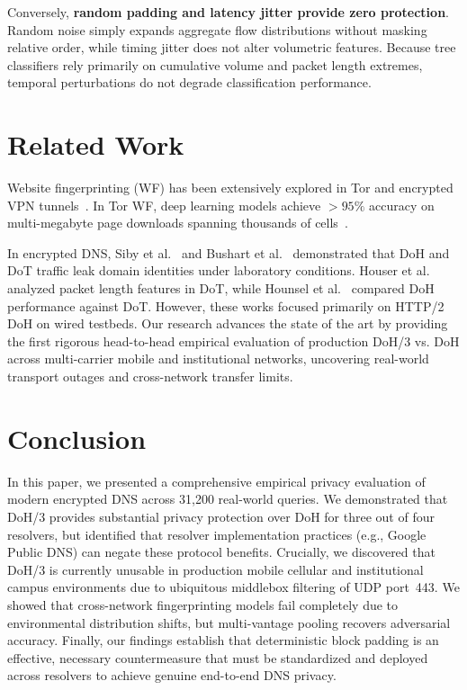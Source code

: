 \documentclass[conference,10pt]{IEEEtran}
\begin{document}
Conversely, \textbf{random padding and latency jitter provide zero protection}. Random noise simply expands aggregate flow distributions without masking relative order, while timing jitter does not alter volumetric features. Because tree classifiers rely primarily on cumulative volume and packet length extremes, temporal perturbations do not degrade classification performance.

\section{Related Work}
\label{sec:related}

Website fingerprinting (WF) has been extensively explored in Tor and encrypted VPN tunnels~\cite{herrmann2009website,sirinam2018deep,wang2017walkie}. In Tor WF, deep learning models achieve $>95\%$ accuracy on multi-megabyte page downloads spanning thousands of cells~\cite{sirinam2018deep,rimmer2018automated}. 

In encrypted DNS, Siby et al.~\cite{siby2020encrypted} and Bushart et al.~\cite{bushart2020padding} demonstrated that DoH and DoT traffic leak domain identities under laboratory conditions. Houser et al.~\cite{houser2019investigation} analyzed packet length features in DoT, while Hounsel et al.~\cite{hounsel2020comparing} compared DoH performance against DoT. However, these works focused primarily on HTTP/2 DoH on wired testbeds. Our research advances the state of the art by providing the first rigorous head-to-head empirical evaluation of production DoH/3 vs. DoH across multi-carrier mobile and institutional networks, uncovering real-world transport outages and cross-network transfer limits.

\newpage
\section{Conclusion}
\label{sec:conclusion}

In this paper, we presented a comprehensive empirical privacy evaluation of modern encrypted DNS across 31,200 real-world queries. We demonstrated that DoH/3 provides substantial privacy protection over DoH for three out of four resolvers, but identified that resolver implementation practices (e.g., Google Public DNS) can negate these protocol benefits. Crucially, we discovered that DoH/3 is currently unusable in production mobile cellular and institutional campus environments due to ubiquitous middlebox filtering of UDP port~443. We showed that cross-network fingerprinting models fail completely due to environmental distribution shifts, but multi-vantage pooling recovers adversarial accuracy. Finally, our findings establish that deterministic block padding is an effective, necessary countermeasure that must be standardized and deployed across resolvers to achieve genuine end-to-end DNS privacy.

\balance


\end{document}
